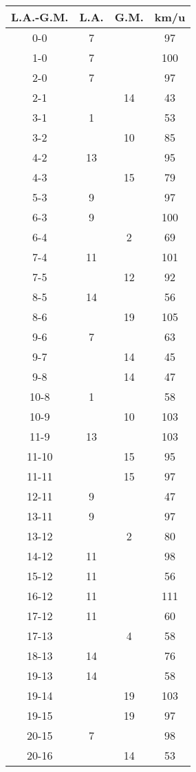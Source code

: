 \begin{table}[ht!]
  \centering
  \scriptsize
  \begin{tabular}{|c|c|c|c|} \hline
    L.A.-G.M. & L.A. & G.M. & km/u \\ \hline
    0-0 & 7 & & 97 \\
    1-0 & 7 & & 100 \\
    2-0 & 7 & & 97 \\
    2-1 & & 14 & 43 \\
    3-1 & 1 & & 53 \\
    3-2 & & 10 & 85 \\
    4-2 & 13 & & 95 \\
    4-3 & & 15 & 79 \\
    5-3 & 9 & & 97 \\
    6-3 & 9 & & 100 \\
    6-4 & & 2 & 69 \\
    7-4 & 11 & & 101 \\
    7-5 & & 12 & 92 \\
    8-5 & 14 & & 56 \\
    8-6 & & 19 & 105 \\
    9-6 & 7 & & 63 \\
    9-7 & & 14 & 45 \\
    9-8 & & 14 & 47 \\
    10-8 & 1 & & 58 \\
    10-9 & & 10 & 103 \\
    11-9 & 13 & & 103 \\
    11-10 & & 15 & 95 \\
    11-11 & & 15 & 97 \\
    12-11 & 9 & & 47 \\
    13-11 & 9 & & 97 \\
    13-12 & & 2 & 80 \\
    14-12 & 11 & & 98 \\
    15-12 & 11 & & 56 \\
    16-12 & 11 & & 111 \\
    17-12 & 11 & & 60 \\
    17-13 & & 4 & 58 \\
    18-13 & 14 & & 76 \\
    19-13 & 14 & & 58 \\
    19-14 & & 19 & 103 \\
    19-15 & & 19 & 97 \\
    20-15 & 7 & & 98 \\
    20-16 & & 14 & 53 \\

\end{tabular}
\end{table}
